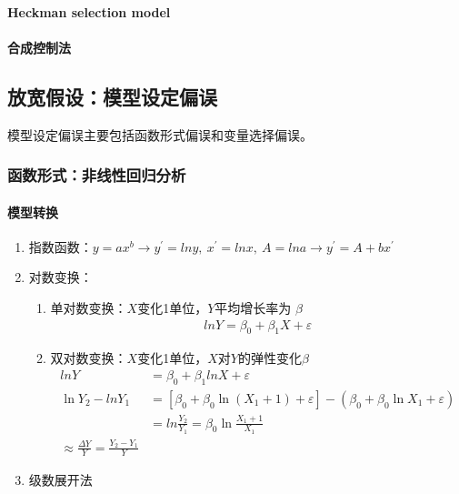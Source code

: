 \documentclass[12pt]{book}
\begin{document}
\paragraph{Heckman selection model}




\paragraph{合成控制法}







\subsection{放宽假设：模型设定偏误}













模型设定偏误主要包括函数形式偏误和变量选择偏误。

\subsubsection{函数形式：非线性回归分析}


\paragraph{模型转换}


\begin{enumerate}[1.]
    \item 指数函数：$y=a{x}^b\rightarrow y^\prime=lny,\ x^\prime=lnx,\ A=lna\rightarrow y^\prime=A+bx^\prime$
    \item 对数变换：
          \begin{enumerate}[(1)]
              \item 单对数变换：$X$变化1单位，$Y$平均增长率为 $\beta$
                    \begin{gather*}
                        lnY=\beta_0+\beta_1X+\varepsilon
                    \end{gather*}
              \item 双对数变换：$X$变化1单位，$X$对$Y$的弹性变化$\beta$
                    \begin{align*}
                        lnY&=\beta_0+\beta_1lnX+\varepsilon\\
                        \ln{Y_2}-lnY_1
                        &=\left[\beta_0+\beta_0\ln{\left(X_1+1\right)}+\varepsilon\right]-\left(\beta_0+\beta_0\ln{X_1}+\varepsilon\right)\\
                        &=ln\frac{Y_2}{Y_1} =\beta_0\ln{\frac{X_1+1}{X_1}}\\
                        \approx\frac{\Delta Y}{Y} =\frac{Y_2-Y_1}{Y}
                    \end{align*}
          \end{enumerate}
    \item 级数展开法
\end{enumerate}
\end{document}
